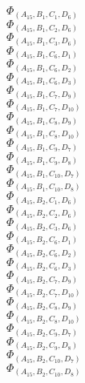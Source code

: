 \documentclass[14pt]{article}
\begin{document}
    $\Phi_{({A}_{15}, {B}_{1}, {C}_{1}, {D}_{6})}$ \\ 
    $\Phi_{({A}_{15}, {B}_{1}, {C}_{2}, {D}_{6})}$ \\ 
    $\Phi_{({A}_{15}, {B}_{1}, {C}_{3}, {D}_{6})}$ \\ 
    $\Phi_{({A}_{15}, {B}_{1}, {C}_{6}, {D}_{1})}$ \\ 
    $\Phi_{({A}_{15}, {B}_{1}, {C}_{6}, {D}_{2})}$ \\ 
    $\Phi_{({A}_{15}, {B}_{1}, {C}_{6}, {D}_{3})}$ \\ 
    $\Phi_{({A}_{15}, {B}_{1}, {C}_{7}, {D}_{9})}$ \\ 
    $\Phi_{({A}_{15}, {B}_{1}, {C}_{7}, {D}_{10})}$ \\ 
    $\Phi_{({A}_{15}, {B}_{1}, {C}_{8}, {D}_{9})}$ \\ 
    $\Phi_{({A}_{15}, {B}_{1}, {C}_{8}, {D}_{10})}$ \\ 
    $\Phi_{({A}_{15}, {B}_{1}, {C}_{9}, {D}_{7})}$ \\ 
    $\Phi_{({A}_{15}, {B}_{1}, {C}_{9}, {D}_{8})}$ \\ 
    $\Phi_{({A}_{15}, {B}_{1}, {C}_{10}, {D}_{7})}$ \\ 
    $\Phi_{({A}_{15}, {B}_{1}, {C}_{10}, {D}_{8})}$ \\ 
    $\Phi_{({A}_{15}, {B}_{2}, {C}_{1}, {D}_{6})}$ \\ 
    $\Phi_{({A}_{15}, {B}_{2}, {C}_{2}, {D}_{6})}$ \\ 
    $\Phi_{({A}_{15}, {B}_{2}, {C}_{3}, {D}_{6})}$ \\ 
    $\Phi_{({A}_{15}, {B}_{2}, {C}_{6}, {D}_{1})}$ \\ 
    $\Phi_{({A}_{15}, {B}_{2}, {C}_{6}, {D}_{2})}$ \\ 
    $\Phi_{({A}_{15}, {B}_{2}, {C}_{6}, {D}_{3})}$ \\ 
    $\Phi_{({A}_{15}, {B}_{2}, {C}_{7}, {D}_{9})}$ \\ 
    $\Phi_{({A}_{15}, {B}_{2}, {C}_{7}, {D}_{10})}$ \\ 
    $\Phi_{({A}_{15}, {B}_{2}, {C}_{8}, {D}_{9})}$ \\ 
    $\Phi_{({A}_{15}, {B}_{2}, {C}_{8}, {D}_{10})}$ \\ 
    $\Phi_{({A}_{15}, {B}_{2}, {C}_{9}, {D}_{7})}$ \\ 
    $\Phi_{({A}_{15}, {B}_{2}, {C}_{9}, {D}_{8})}$ \\ 
    $\Phi_{({A}_{15}, {B}_{2}, {C}_{10}, {D}_{7})}$ \\ 
    $\Phi_{({A}_{15}, {B}_{2}, {C}_{10}, {D}_{8})}$ \\ 
\end{document}
